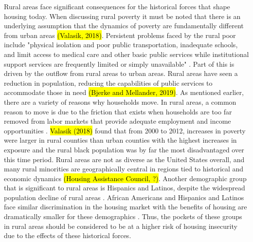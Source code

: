 Rural areas face significant consequences for the historical forces that shape housing today. When discussing rural poverty it must be noted that there is an underlying assumption that the dynamics of poverty are fundamentally different from urban areas \hl{(Valasik, 2018)}. Persistent problems faced by the rural poor include "physical isolation and poor public transportation, inadequate schools, and limit access to medical care and other basic public services while institutional support services are frequently limited or simply unavailable" \citep[?]{lichter_changing_2007}. Part of this is driven by the outflow from rural areas to urban areas. Rural areas have seen a reduction in population, reducing the capabilities of public services to accommodate those in need \hl{(Bjerke and Mellander, 2019)}. As mentioned earlier, there are a variety of reasons why households move. In rural areas, a common reason to move is due to the friction that exists when households are too far removed from labor markets that provide adequate employment and income opportunities \citep{sparks_poverty_2013}. \hl{Valasik (2018)} found that from 2000 to 2012, increases in poverty were larger in rural counties than urban counties with the highest increases in exposure and the rural black population was by far the most disadvantaged over this time period. Rural areas are not as diverse as the United States overall, and many rural minorities are geographically central in regions tied to historical and economic dynamics \hl{(Housing Assistance Council, ?)}. Another demographic group that is significant to rural areas is Hispanics and Latinos, despite the widespread population decline of rural areas \citep{lichter_demographic_2020}. African Americans and Hispanics and Latinos face similar discrimination in the housing market with the benefits of housing are dramatically smaller for these demographics \citep{krivo_housing_2004}. Thus, the pockets of these groups in rural areas should be considered to be at a higher risk of housing insecurity due to the effects of these historical forces. 


